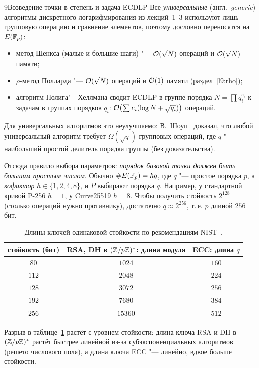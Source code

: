 \begin{lecture}{9}{Возведение точки в степень и задача ECDLP}
Все \emph{универсальные} (англ.\ \emph{generic}) алгоритмы дискретного логарифмирования из
лекций~1--3 используют лишь групповую операцию и сравнение элементов, поэтому дословно
переносятся на $E(\mathbb{F}_p)$:
\begin{itemize}
  \item метод Шенкса (малые и большие шаги) "--- $\mathcal{O}(\sqrt N)$ операций и
    $\mathcal{O}(\sqrt N)$ памяти;
  \item $\rho$-метод Полларда "--- $\mathcal{O}(\sqrt N)$ операций и $\mathcal{O}(1)$ памяти
    (раздел~\ref{l9:rho});
  \item алгоритм Полига"--~Хеллмана сводит ECDLP в группе порядка $N = \prod q_i^{e_i}$
    к задачам в группах порядков $q_i$: $\mathcal{O}\bigl(\sum e_i (\log N + \sqrt{q_i})\bigr)$ операций.
\end{itemize}
Для универсальных алгоритмов это неулучшаемо: В.~Шоуп~\cite{shoup-generic} доказал, что любой
универсальный алгоритм требует $\Omega(\sqrt q)$ групповых операций, где $q$ "--- наибольший
простой делитель порядка группы (без доказательства).

Отсюда правило выбора параметров: \emph{порядок базовой точки должен быть большим простым
числом}. Обычно $\#E(\mathbb{F}_p) = hq$, где $q$ "--- простое порядка $p$, а \emph{кофактор}
$h \in \{1, 2, 4, 8\}$, и $P$ выбирают порядка $q$. Например, у стандартной кривой P-256
$h = 1$, у Curve25519 $h = 8$. Чтобы получить стойкость $2^{128}$ (столько операций нужно
противнику), достаточно $q \approx 2^{256}$, т.\,е. $p$ длиной $256$ бит.

\begin{table}[h]
\centering
\begin{tabular}{c|c|c}
  стойкость (бит) & RSA, DH в $(\mathbb{Z}/p\mathbb{Z})^{*}$: длина модуля & ECC: длина $q$ \\ \hline
  $80$  & $1024$  & $160$ \\
  $112$ & $2048$  & $224$ \\
  $128$ & $3072$  & $256$ \\
  $192$ & $7680$  & $384$ \\
  $256$ & $15360$ & $512$
\end{tabular}
\caption{Длины ключей одинаковой стойкости по рекомендациям NIST~\cite{nist-sp800-57}.}
\label{l9:keysizes}
\end{table}

Разрыв в таблице~\ref{l9:keysizes} растёт с уровнем стойкости: длина ключа RSA и DH в $(\mathbb{Z}/p\mathbb{Z})^{*}$
растёт быстрее линейной из-за субэкспоненциальных алгоритмов (решето числового поля),
а длина ключа ECC "--- линейно, вдвое больше стойкости.


\end{lecture}
